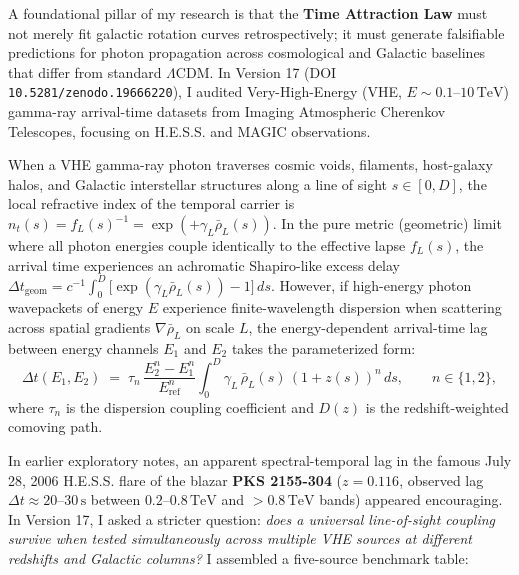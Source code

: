 
A foundational pillar of my research is that the \textbf{Time Attraction Law} must not merely fit galactic rotation curves retrospectively; it must generate falsifiable predictions for photon propagation across cosmological and Galactic baselines that differ from standard $\Lambda$CDM. In Version 17 (DOI \texttt{10.5281/zenodo.19666220}), I audited Very-High-Energy (VHE, $E \sim 0.1\text{--}10\,\text{TeV}$) gamma-ray arrival-time datasets from Imaging Atmospheric Cherenkov Telescopes, focusing on H.E.S.S. and MAGIC observations.

\par
When a VHE gamma-ray photon traverses cosmic voids, filaments, host-galaxy halos, and Galactic interstellar structures along a line of sight $s \in [0, D]$, the local refractive index of the temporal carrier is $n_t(s) = f_L(s)^{-1} = \exp(+\gamma_L \bar{\rho}_L(s))$. In the pure metric (geometric) limit where all photon energies couple identically to the effective lapse $f_L(s)$, the arrival time experiences an achromatic Shapiro-like excess delay $\Delta t_{\text{geom}} = c^{-1}\int_0^D \bigl[\exp(\gamma_L\bar{\rho}_L(s)) - 1\bigr]\,ds$. However, if high-energy photon wavepackets of energy $E$ experience finite-wavelength dispersion when scattering across spatial gradients $\nabla\bar{\rho}_L$ on scale $L$, the energy-dependent arrival-time lag between energy channels $E_1$ and $E_2$ takes the parameterized form:
\begin{equation}
  \Delta t(E_1, E_2) \;=\; \tau_n\,\frac{E_2^n - E_1^n}{E_{\text{ref}}^n}\int_0^D \gamma_L\,\bar{\rho}_L(s)\,(1+z(s))^n\,ds, \qquad n \in \{1, 2\},
\end{equation}
where $\tau_n$ is the dispersion coupling coefficient and $D(z)$ is the redshift-weighted comoving path.

\par
In earlier exploratory notes, an apparent spectral-temporal lag in the famous July 28, 2006 H.E.S.S. flare of the blazar \textbf{PKS 2155-304} ($z = 0.116$, observed lag $\Delta t \approx 20\text{--}30\,\text{s}$ between $0.2\text{--}0.8\,\text{TeV}$ and $>0.8\,\text{TeV}$ bands) appeared encouraging. In Version 17, I asked a stricter question: \emph{does a universal line-of-sight coupling survive when tested simultaneously across multiple VHE sources at different redshifts and Galactic columns?} I assembled a five-source benchmark table:


